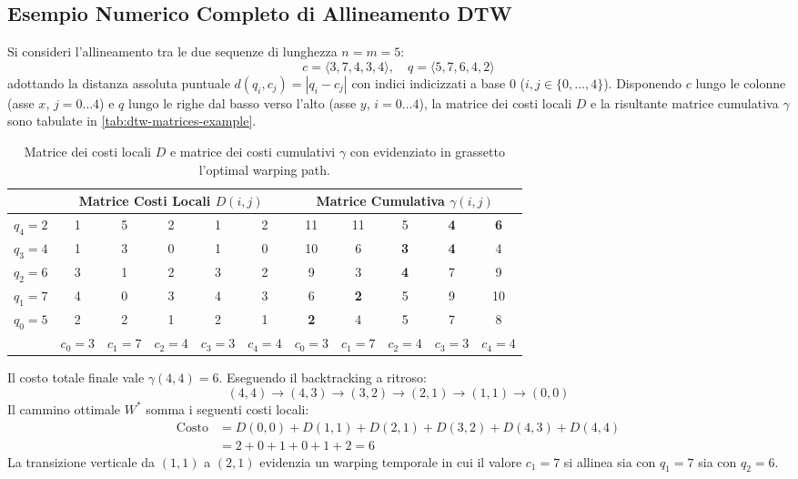\FloatBarrier
\subsection{Esempio Numerico Completo di Allineamento DTW}
\label{subsec:ts-dtw-example-walkthrough}

Si consideri l'allineamento tra le due sequenze di lunghezza $n=m=5$:
\begin{equation*}
c = \langle 3, 7, 4, 3, 4 \rangle, \quad q = \langle 5, 7, 6, 4, 2 \rangle
\end{equation*}
adottando la distanza assoluta puntuale $d(q_i, c_j) = |q_i - c_j|$ con indici indicizzati a base 0 ($i, j \in \{0, \dots, 4\}$). Disponendo $c$ lungo le colonne (asse $x$, $j=0 \dots 4$) e $q$ lungo le righe dal basso verso l'alto (asse $y$, $i=0 \dots 4$), la matrice dei costi locali $D$ e la risultante matrice cumulativa $\gamma$ sono tabulate in \autoref{tab:dtw-matrices-example}.

\begin{table}[H]
\centering
\scriptsize
\setlength{\tabcolsep}{3.5pt}
\renewcommand{\arraystretch}{1.2}
\begin{tabular}{c | c c c c c | c c c c c}
\toprule
& \multicolumn{5}{c|}{\textbf{Matrice Costi Locali $D(i,j)$}} & \multicolumn{5}{c}{\textbf{Matrice Cumulativa $\gamma(i,j)$}} \\
\midrule
$q_4=2$ & 1 & 5 & 2 & 1 & 2 & 11 & 11 & 5 & \textbf{4} & \textbf{6} \\
$q_3=4$ & 1 & 3 & 0 & 1 & 0 & 10 & 6 & \textbf{3} & \textbf{4} & 4 \\
$q_2=6$ & 3 & 1 & 2 & 3 & 2 & 9 & 3 & \textbf{4} & 7 & 9 \\
$q_1=7$ & 4 & 0 & 3 & 4 & 3 & 6 & \textbf{2} & 5 & 9 & 10 \\
$q_0=5$ & 2 & 2 & 1 & 2 & 1 & \textbf{2} & 4 & 5 & 7 & 8 \\
\midrule
& $c_0=3$ & $c_1=7$ & $c_2=4$ & $c_3=3$ & $c_4=4$ & $c_0=3$ & $c_1=7$ & $c_2=4$ & $c_3=3$ & $c_4=4$ \\
\bottomrule
\end{tabular}
\caption{Matrice dei costi locali $D$ e matrice dei costi cumulativi $\gamma$ con evidenziato in grassetto l'optimal warping path.}
\label{tab:dtw-matrices-example}
\end{table}

Il costo totale finale vale $\gamma(4,4) = 6$. Eseguendo il backtracking a ritroso:
\begin{equation}
(4,4) \to (4,3) \to (3,2) \to (2,1) \to (1,1) \to (0,0)
\end{equation}
Il cammino ottimale $W^*$ somma i seguenti costi locali:
\begin{align*}
\text{Costo} &= D(0,0) + D(1,1) + D(2,1) + D(3,2) + D(4,3) + D(4,4) \\
&= 2 + 0 + 1 + 0 + 1 + 2 = 6
\end{align*}
La transizione verticale da $(1,1)$ a $(2,1)$ evidenzia un warping temporale in cui il valore $c_1=7$ si allinea sia con $q_1=7$ sia con $q_2=6$.

